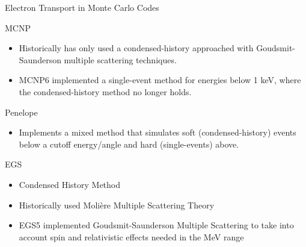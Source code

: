 \documentclass{beamer}
\begin{document}
\begin{frame}{Electron Transport in Monte Carlo Codes}

  \begin{block}{MCNP}
    \begin{itemize}
      \item Historically has only used a condensed-history approached with Goudsmit-Saunderson multiple scattering techniques.
      \item MCNP6 implemented a single-event method for energies below 1 keV, 
              where the condensed-history method no longer holds.
    \end{itemize}
  \end{block}
    
  \begin{block}{Penelope}
    \begin{itemize}
      \item Implements a mixed method that simulates soft (condensed-history) 
              events below a cutoff energy/angle and hard (single-events) above.
    \end{itemize}    
  \end{block}

  \begin{block}{EGS}
    \begin{itemize}
      \item Condensed History Method
      \item Historically used Moli\`ere Multiple Scattering Theory
      \item EGS5 implemented Goudsmit-Saunderson Multiple Scattering to take into account spin and relativistic effects needed in the MeV range
    \end{itemize}    
  \end{block}
    

\end{frame}
\end{document}
